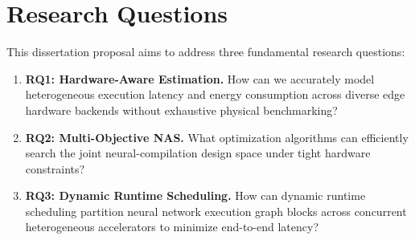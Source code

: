\section{Research Questions}
This dissertation proposal aims to address three fundamental research questions:
\begin{enumerate}
    \item \textbf{RQ1: Hardware-Aware Estimation.} How can we accurately model heterogeneous execution latency and energy consumption across diverse edge hardware backends without exhaustive physical benchmarking?
    \item \textbf{RQ2: Multi-Objective NAS.} What optimization algorithms can efficiently search the joint neural-compilation design space under tight hardware constraints?
    \item \textbf{RQ3: Dynamic Runtime Scheduling.} How can dynamic runtime scheduling partition neural network execution graph blocks across concurrent heterogeneous accelerators to minimize end-to-end latency?
\end{enumerate}
